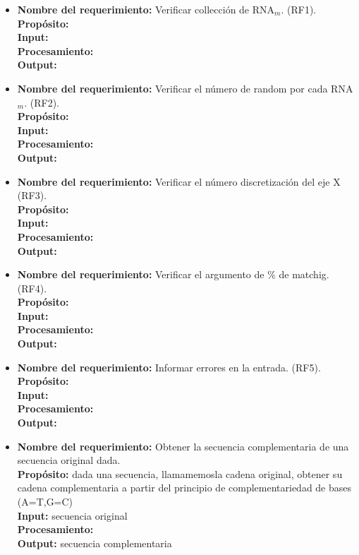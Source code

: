 \documentclass[12pt,a4paper,english,spanish]{article}
\begin{document}
	\begin{itemize}
		\item \textbf{Nombre del requerimiento:} Verificar collección de RNA$_m$. (RF1).\\
 	    \textbf{Propósito:} \\
		\textbf{Input:} \\
		\textbf{Procesamiento:} \\
		\textbf{Output:} \\

		\item \textbf{Nombre del requerimiento:} Verificar el número de random por cada RNA$_m$. (RF2).\\
 	    \textbf{Propósito:} \\
		\textbf{Input:} \\
		\textbf{Procesamiento:} \\
		\textbf{Output:} \\

		\item \textbf{Nombre del requerimiento:} Verificar el número discretización del eje X (RF3).\\
 	    \textbf{Propósito:} \\
		\textbf{Input:} \\
		\textbf{Procesamiento:} \\
		\textbf{Output:} \\

		\item \textbf{Nombre del requerimiento:} Verificar el argumento de \% de matchig. (RF4).\\
 	    \textbf{Propósito:} \\
		\textbf{Input:} \\
		\textbf{Procesamiento:} \\
		\textbf{Output:} \\

		\item \textbf{Nombre del requerimiento:} Informar errores en la entrada. (RF5).\\
 	    \textbf{Propósito:} \\
		\textbf{Input:} \\
		\textbf{Procesamiento:} \\
		\textbf{Output:} \\

		\item \textbf{Nombre del requerimiento:} Obtener la secuencia complementaria de una secuencia original dada.\\
		\textbf{Propósito:} dada una secuencia, llamamemosla cadena original, obtener su cadena complementaria a partir del principio de 										complementariedad de bases (A=T,G=C)\\
		\textbf{Input:} secuencia original\\
		\textbf{Procesamiento:} \\
		\textbf{Output:} secuencia complementaria\\


\end{itemize}
\end{document}

